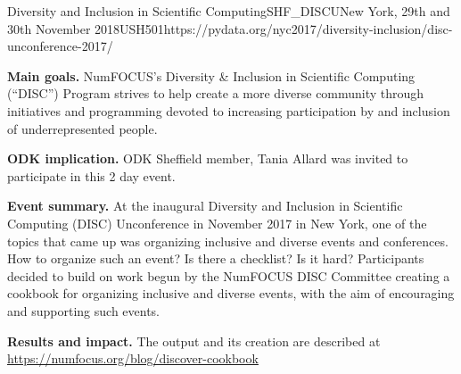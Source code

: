 \begin{event}{Diversity and Inclusion in Scientific Computing}{SHF_DISCU}{New York, 29th and 30th November 2018}{USH}{50}{1}{https://pydata.org/nyc2017/diversity-inclusion/disc-unconference-2017/}

\textbf{Main goals.} NumFOCUS's Diversity \& Inclusion in Scientific Computing (``DISC'') Program strives to help create a more diverse community through initiatives and programming devoted to increasing participation by and inclusion of underrepresented people.

\textbf{ODK implication.} ODK Sheffield member, Tania Allard was invited to participate in this 2 day event.

\textbf{Event summary.} At the inaugural Diversity and Inclusion in Scientific Computing (DISC) Unconference in November 2017 in New York, one of the topics that came up was organizing inclusive and diverse events and conferences. How to organize such an event? Is there a checklist? Is it hard? Participants decided to build on work begun by the NumFOCUS DISC Committee creating a cookbook for organizing inclusive and diverse events, with the aim of encouraging and supporting such events.

\textbf{Results and impact.} The output and its creation are described at \url{https://numfocus.org/blog/discover-cookbook}

\end{event}

